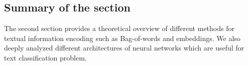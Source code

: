 \subsection{Summary of the section}

The second section provides a theoretical overview of different methods for textual information 
encoding such as Bag-of-words and embeddings. 
We also deeply analyzed different architectures of neural networks which 
are useful for text classification problem. 